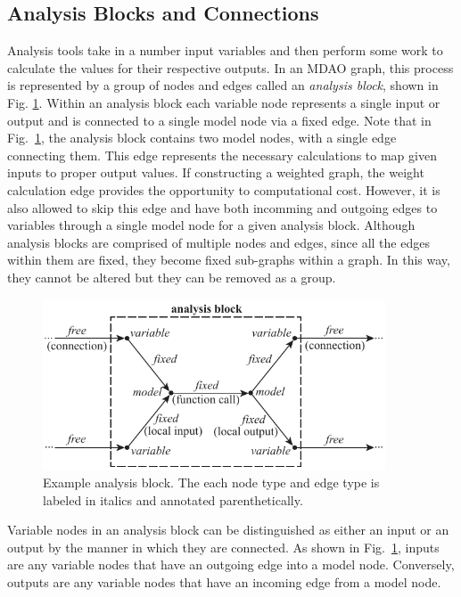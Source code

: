 \subsection{Analysis Blocks and Connections}
\label{ss:analysis blocks and connections}
Analysis tools take in a number input variables and then perform some work to calculate 
the values for their respective outputs. In an MDAO graph, this process is 
represented by a group of nodes and edges called an \emph{analysis block}, 
shown in Fig. \ref{f:analysis block}. Within an analysis block each variable 
node represents a single input or output and is connected 
to a single model node via a fixed edge. Note that in Fig.~\ref{f:analysis block}, 
the analysis block contains two model nodes, with a single edge connecting them. 
This edge represents the necessary calculations to map given inputs 
to proper output values. If constructing a weighted graph, the weight calculation edge 
provides the opportunity to computational cost. However, it is also allowed to 
skip this edge and have both incomming and outgoing edges to variables through a 
single model node for a given analysis block. Although analysis blocks are 
comprised of multiple nodes and edges, since all the edges within them are 
fixed, they become fixed sub-graphs within a graph. In this way, they cannot be 
altered but they can be removed as a group.

\begin{figure}[htb!]
    \begin{center}
    \includegraphics[width=4in]{images/analysis_block}
    \end{center}
    \vspace{-10pt}
\caption{Example analysis block. The each node type and edge type is labeled in italics and annotated parenthetically.}
\label{f:analysis block}
\end{figure}

Variable nodes in an analysis block can be distinguished as either an input or 
an output by the manner in which they are connected. As shown in Fig.~\ref{f:analysis block}, 
inputs are any variable nodes that have an outgoing edge into a model 
node. Conversely, outputs are any variable nodes that have an incoming edge from a model node. 


